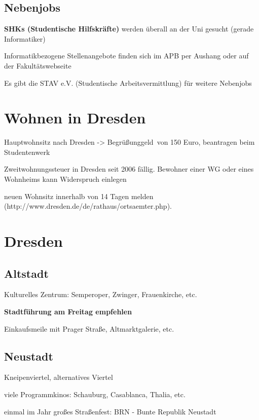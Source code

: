 \documentclass[a4paper,12pt]{report}
\begin{document}
\subsection{Nebenjobs}
\begin{itemize*}
\item \textbf{SHKs (Studentische Hilfskräfte)} werden überall an der Uni gesucht (gerade Informatiker)
\item Informatikbezogene Stellenangebote finden sich im APB per Aushang oder auf der Fakultätswebseite
\item Es gibt die STAV e.V. (Studentische Arbeitsvermittlung) für weitere Nebenjobs
\end{itemize*}

\section{Wohnen in Dresden}
\begin{itemize*}
  \item Hauptwohnsitz nach Dresden -> \glqq Begrüßunggeld\grqq\ von 150 Euro, beantragen beim Studentenwerk
  \item Zweitwohnungssteuer in Dresden seit 2006 fällig. Bewohner einer WG oder eines Wohnheims kann Widerspruch einlegen
	\item neuen Wohnsitz innerhalb von 14 Tagen melden\\
  (http://www.dresden.de/de/rathaus/ortsaemter.php).
\end{itemize*}

\section{Dresden}

\subsection{Altstadt}
\begin{itemize*}
	\item Kulturelles Zentrum: Semperoper, Zwinger, Frauenkirche, etc.
  \item \textbf{Stadtführung am Freitag empfehlen}
	\item Einkaufsmeile mit Prager Straße, Altmarktgalerie, etc.
\end{itemize*}

\subsection{Neustadt}
\begin{itemize*}
	\item Kneipenviertel, alternatives Viertel
	\item viele Programmkinos: Schauburg, Casablanca, Thalia, etc.
	\item einmal im Jahr großes Straßenfest: BRN - Bunte Republik Neustadt
\end{itemize*}
\end{document}
